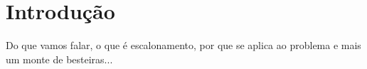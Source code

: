 \section{Introdução}

Do que vamos falar, o que é escalonamento, por que se aplica ao problema e mais um monte de besteiras...

